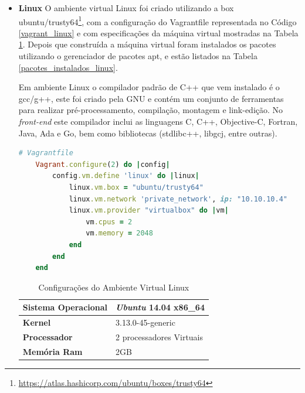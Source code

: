 \begin{itemize}

    \item \textbf{Linux}
        \subitem  O ambiente virtual Linux foi criado utilizando a box
 ubuntu/trusty64\footnote{\url{https://atlas.hashicorp.com/ubuntu/boxes/trusty64}},
 com a configuração do Vagrantfile representada no Código \ref{vagrant_linux} e com especificações
 da máquina virtual mostradas na Tabela \ref{especificacoes_linux}.
 Depois que construída a máquina virtual foram instalados os pacotes utilizando o
 gerenciador de pacotes apt, e estão listados na Tabela \ref{pacotes_instalados_linux}.

Em ambiente Linux o compilador padrão de C++ que vem instalado é o gcc/g++, este foi
 criado pela GNU e contém um conjunto de ferramentas para realizar pré-processamento,
 compilação, montagem e link-edição. No \textit{front-end} este compilador inclui as linguagens C,
 C++, Objective-C, Fortran, Java, Ada e Go, bem como bibliotecas (stdlibc++, libgcj, entre outras).


\begin{lstlisting}[language=ruby, caption={Vagrantfile com configurações da máquina virtual linux},
                  label=vagrant_linux]
    # Vagrantfile
    Vagrant.configure(2) do |config|
        config.vm.define 'linux' do |linux|
            linux.vm.box = "ubuntu/trusty64"
            linux.vm.network 'private_network', ip: "10.10.10.4"
            linux.vm.provider "virtualbox" do |vm| 
                vm.cpus = 2
                vm.memory = 2048
            end
        end              
    end
\end{lstlisting}

\begin{table}[h]
\centering
\caption{Configurações do Ambiente Virtual Linux}
\label{especificacoes_linux}
\begin{tabular}{ll}
\textbf{Sistema Operacional} & \textit{Ubuntu} 14.04 x86\_64 \\ \toprule
\textbf{Kernel} & 3.13.0-45-generic  \\ \midrule 
\textbf{Processador} & 2 processadores Virtuais \\ \midrule
\textbf{Memória Ram} & 2GB  \\ \bottomrule 
\end{tabular} 
\end{table}


\end{itemize}
